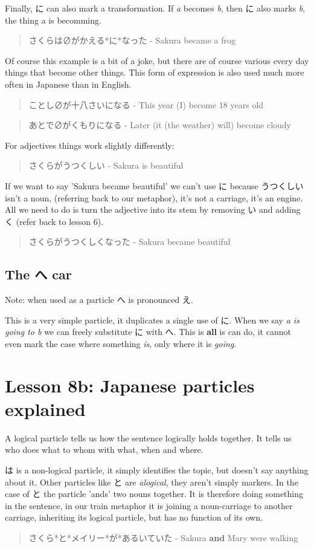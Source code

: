 \documentclass[11pt]{article}
\begin{document}
Finally, に can also mark a transformation. If \emph{a} becomes \emph{b}, then に also marks \emph{b}, the thing a is becomming.
\begin{quote}
さくらは∅がかえる*に*なった - Sakura became a frog
\end{quote}
Of course this example is a bit of a joke, but there are of course various every day things that become other things. This form of expression is also used much more often in Japanese than in English.
\begin{quote}
ことし∅が十八さいになる - This year (I) become 18 years old
\end{quote}
\begin{quote}
あとで∅がくもりになる - Later (it (the weather) will) become cloudy
\end{quote}

For adjectives things work slightly differently:
\begin{quote}
さくらがうつくしい - Sakura is beautiful
\end{quote}
If we want to say 'Sakura became beautiful' we can't use に because うつくしい isn't a noun, (referring back to our metaphor), it's not a carriage, it's an engine. All we need to do is turn the adjective into its stem by removing い and adding く (refer back to lesson 6).

\begin{quote}
さくらがうつくしくなった - Sakura became beautiful
\end{quote}

\subsection{The へ car}
\label{sec:org5a053f4}
Note: when used as a particle へ is pronounced え.

This is a very simple particle, it duplicates a single use of に. When we say \emph{a is going to b} we can freely substitute に with へ. This is \textbf{all} is can do, it cannot even mark the case where something \emph{is}, only where it is \emph{going}.
\section{Lesson 8b: Japanese particles explained}
\label{sec:org0c057ac}
A logical particle tells us how the sentence logically holds together. It tells us who does what to whom with what, when and where.

は is a non-logical particle, it simply identifies the topic, but doesn't say anything about it. Other particles like と are \emph{alogical}, they aren't simply markers. In the case of と the particle 'ands' two nouns together. It is therefore doing something in the sentence, in our train metaphor it is joining a noun-carriage to another carriage, inheriting its logical particle, but has no function of its own.
\begin{quote}
さくら*と*メイリー*が*あるいていた - Sakura \textbf{and} Mary were walking
\end{quote}
\end{document}
